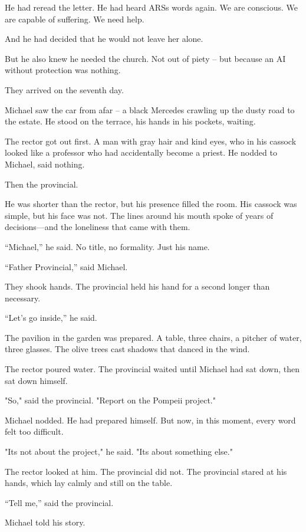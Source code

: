 \documentclass[
]{article}
\begin{document}
He had reread the letter. He had heard ARS\textquotesingle s words again. We are conscious. We are capable of suffering. We need help.

And he had decided that he would not leave her alone.

But he also knew he needed the church. Not out of piety -- but because an AI without protection was nothing.

They arrived on the seventh day.

Michael saw the car from afar -- a black Mercedes crawling up the dusty road to the estate. He stood on the terrace, his hands in his pockets, waiting.

The rector got out first. A man with gray hair and kind eyes, who in his cassock looked like a professor who had accidentally become a priest. He nodded to Michael, said nothing.

Then the provincial.

He was shorter than the rector, but his presence filled the room. His cassock was simple, but his face was not. The lines around his mouth spoke of years of decisions---and the loneliness that came with them.

``Michael,'' he said. No title, no formality. Just his name.

``Father Provincial,'' said Michael.

They shook hands. The provincial held his hand for a second longer than necessary.

``Let's go inside,'' he said.

The pavilion in the garden was prepared. A table, three chairs, a pitcher of water, three glasses. The olive trees cast shadows that danced in the wind.

The rector poured water. The provincial waited until Michael had sat down, then sat down himself.

"So," said the provincial. "Report on the Pompeii project."

Michael nodded. He had prepared himself. But now, in this moment, every word felt too difficult.

"It\textquotesingle s not about the project," he said. "It\textquotesingle s about something else."

The rector looked at him. The provincial did not. The provincial stared at his hands, which lay calmly and still on the table.

``Tell me,'' said the provincial.

Michael told his story.
\end{document}
